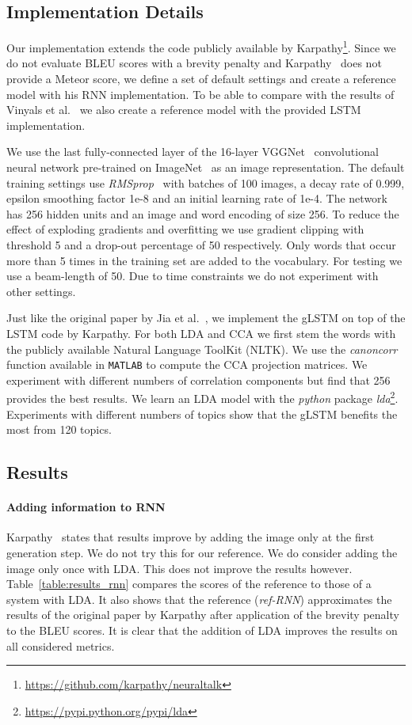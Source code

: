 \documentclass[twoside,twocolumn]{article}
\begin{document}
	\subsection{Implementation Details}
	
	Our implementation extends the code publicly available by Karpathy\footnote{\url{https://github.com/karpathy/neuraltalk}}.
	Since we do not evaluate BLEU scores with a brevity penalty and Karpathy~\cite{Karpathy2015} does not provide a Meteor score, we define a set of default settings and create a reference model with his RNN implementation.
	To be able to compare with the results of Vinyals et al.~\cite{Google} we also create a reference model with the provided LSTM implementation.
	
	We use the last fully-connected layer of the 16-layer VGGNet~\cite{Arge2015} convolutional neural network pre-trained on ImageNet~\cite{Russakovsky2014} as an image representation.
	The default training settings use \emph{RMSprop}~\cite{RMSprop} with batches of 100 images, a decay rate of 0.999, epsilon smoothing factor 1e-8 and an initial learning rate of 1e-4. The network has 256 hidden units and an image and word encoding of size 256.
	To reduce the effect of exploding gradients and overfitting we use gradient clipping with threshold 5 and a drop-out percentage of 50 respectively.
	Only words that occur more than 5 times in the training set are added to the vocabulary. For testing we use a beam-length of 50.
	Due to time constraints we do not experiment with other settings.
	
	Just like the original paper by Jia et al.~\cite{Fernando2015}, we implement the gLSTM on top of the LSTM code by Karpathy.
	For both LDA and CCA we first stem the words with the publicly available Natural Language ToolKit (NLTK)\cite{bird2009natural}.
	We use the \emph{canoncorr} function available in \texttt{MATLAB} to compute the CCA projection matrices. We experiment with different numbers of correlation components but find that 256 provides the best results.
	We learn an LDA model with the \emph{python} package \emph{lda}\footnote{\url{https://pypi.python.org/pypi/lda}}. 
	Experiments with different numbers of topics show that the gLSTM benefits the most from 120 topics.
	
	
	\subsection{Results}
	\paragraph{Adding information to RNN}
	Karpathy~\cite{Karpathy2015} states that results improve by adding the image only at the first generation step.
	We do not try this for our reference. We do consider adding the image only once with LDA. This does not improve the results however.
	Table~\ref{table:results_rnn} compares the scores of the reference to those of a system with LDA. It also shows that the reference (\emph{ref-RNN}) approximates the results of the original paper by Karpathy after application of the brevity penalty to the BLEU scores. 
	It is clear that the addition of LDA improves the results on all considered metrics.
	
\end{document}
